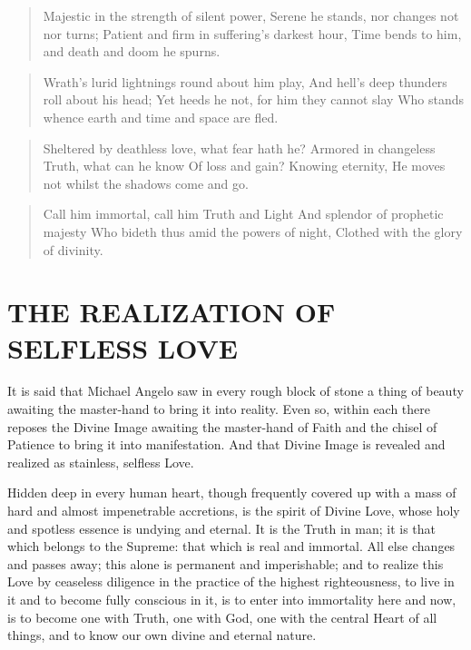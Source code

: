 \documentclass[12pt,oneside]{scrbook}
\begin{document}
  \begin{quote}
  Majestic in the strength of silent power, Serene he stands, nor changes
  not nor turns; Patient and firm in suffering's darkest hour, Time bends
  to him, and death and doom he spurns.
  \end{quote}
  
  \begin{quote}
  Wrath's lurid lightnings round about him play, And hell's deep thunders
  roll about his head; Yet heeds he not, for him they cannot slay Who
  stands whence earth and time and space are fled.
  \end{quote}
  
  \begin{quote}
  Sheltered by deathless love, what fear hath he? Armored in changeless
  Truth, what can he know Of loss and gain? Knowing eternity, He moves not
  whilst the shadows come and go.
  \end{quote}
  
  \begin{quote}
  Call him immortal, call him Truth and Light And splendor of prophetic
  majesty Who bideth thus amid the powers of night, Clothed with the glory
  of divinity.
  \end{quote}
  
  \section{THE REALIZATION OF SELFLESS
  LOVE}\label{the-realization-of-selfless-love}
  
  It is said that Michael Angelo saw in every rough block of stone a thing
  of beauty awaiting the master-hand to bring it into reality. Even so,
  within each there reposes the Divine Image awaiting the master-hand of
  Faith and the chisel of Patience to bring it into manifestation. And
  that Divine Image is revealed and realized as stainless, selfless Love.
  
  Hidden deep in every human heart, though frequently covered up with a
  mass of hard and almost impenetrable accretions, is the spirit of Divine
  Love, whose holy and spotless essence is undying and eternal. It is the
  Truth in man; it is that which belongs to the Supreme: that which is
  real and immortal. All else changes and passes away; this alone is
  permanent and imperishable; and to realize this Love by ceaseless
  diligence in the practice of the highest righteousness, to live in it
  and to become fully conscious in it, is to enter into immortality here
  and now, is to become one with Truth, one with God, one with the central
  Heart of all things, and to know our own divine and eternal nature.
  
\end{document}
